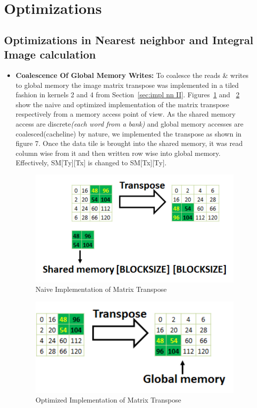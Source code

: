 \section{Optimizations}\label{sec:optim}

\subsection{Optimizations in Nearest neighbor and Integral Image calculation}\label{sec:nn_optim}

\begin{itemize}

\item \textbf{Coalescence Of Global Memory Writes:}
To coalesce the reads \& writes to global memory the image matrix transpose was 
implemented in a tiled fashion in kernels 2 and 4 from Section~\ref{sec:impl nn II}. 
Figures~\ref{fig:naive} and ~\ref{fig:optim} show the naive 
and optimized implementation of the matrix transpose respectively from a memory 
access point of view. As the shared memory access are discrete\textit{(each word from a bank)}
and global memory accesses are coalesced(cacheline) by nature, we implemented the 
transpose as shown in figure 7. Once the data tile is brought into the shared memory, 
it was read column wise from it and then written row wise into global memory. 
Effectively, SM[Ty][Tx] is changed to SM[Tx][Ty]. 

\begin{figure}[h]
  \centering
  \includegraphics[width=\linewidth]{figs/nn_naive_crop.pdf}
  \caption{Naive Implementation of Matrix Transpose }
  \label{fig:naive}
\end{figure}

\begin{figure}[h]
  \centering
  \includegraphics[width=0.9\linewidth]{figs/nn_optim_crop.pdf}
  \caption{Optimized Implementation of Matrix Transpose }
  \label{fig:optim}
\end{figure}


\end{itemize}
